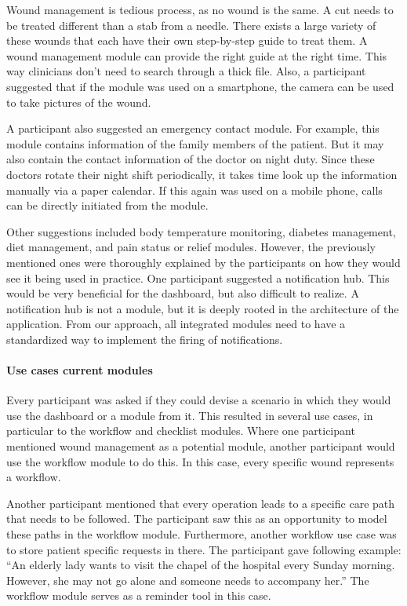    Wound management is tedious process, as no wound is the same. A cut needs to be treated different than a stab from a needle. There exists a large variety of these wounds that each have their own step-by-step guide to treat them. A wound management module can provide the right guide at the right time. This way clinicians don't need to search through a thick file. Also, a participant suggested that if the module was used on a smartphone, the camera can be used to take pictures of the wound.

    A participant also suggested an emergency contact module. For example, this module contains information of the family members of the patient. But it may also contain the contact information of the doctor on night duty. Since these doctors rotate their night shift periodically, it takes time look up the information manually via a paper calendar. If this again was used on a mobile phone, calls can be directly initiated from the module.

    Other suggestions included body temperature monitoring, diabetes management, diet management, and pain status or relief modules. However, the previously mentioned ones were thoroughly explained by the participants on how they would see it being used in practice. One participant suggested a notification hub. This would be very beneficial for the dashboard, but also difficult to realize. A notification hub is not a module, but it is deeply rooted in the architecture of the application. From our approach, all integrated modules need to have a standardized way to implement the firing of notifications.

    \paragraph{Use cases current modules}

    Every participant was asked if they could devise a scenario in which they would use the dashboard or a module from it. This resulted in several use cases, in particular to the workflow and checklist modules. Where one participant mentioned wound management as a potential module, another participant would use the workflow module to do this. In this case, every specific wound represents a workflow. 
    
    Another participant mentioned that every operation leads to a specific care path that needs to be followed. The participant saw this as an opportunity to model these paths in the workflow module. Furthermore, another workflow use case was to store patient specific requests in there. The participant gave following example: ``An elderly lady wants to visit the chapel of the hospital every Sunday morning. However, she may not go alone and someone needs to accompany her.'' The workflow module serves as a reminder tool in this case.

